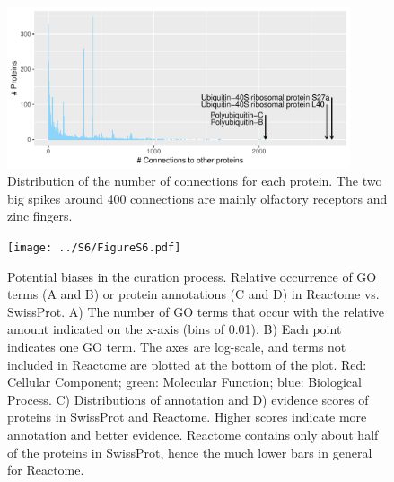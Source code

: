 \documentclass[10pt,twoside]{article}
\begin{document}
\begin{figure}
  \centering
  \includegraphics[width=0.9\textwidth]{../S4/FigureS4.pdf}
  \caption[Distribution of the number of connections for each protein]{Distribution of the number of connections for each protein.
    The two big spikes around 400 connections are mainly olfactory
    receptors and zinc fingers. 
  }
  \label{fig:s4}
\end{figure}


\begin{figure}
  \centering
  \texttt{[image: ../S6/FigureS6.pdf]}
  \caption[Potential biases in the curation process]{Potential biases in the curation process. Relative
    occurrence of GO terms (A and B) or protein annotations (C and D)
    in Reactome vs. SwissProt. A) The number of GO terms that occur
    with the relative amount indicated on the x-axis (bins of
    0.01). B) Each point indicates one GO term. The axes are
    log-scale, and terms not included in Reactome are plotted at the
    bottom of the plot. Red: Cellular Component; green: Molecular
    Function; blue: Biological Process. C) Distributions of annotation
    and D) evidence scores of proteins in SwissProt and
    Reactome. Higher scores indicate more annotation and better
    evidence. Reactome contains only about half of the proteins in
    SwissProt, hence the much lower bars in general for Reactome.}
  \label{fig:s6}
\end{figure}

\clearpage
\end{document}
